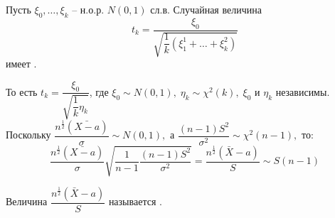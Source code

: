 \vspace{2cm}
\begin{definition}\label{cha:8/def:1}
  Пусть $ \xi_0, \ldots, \xi_k $ -- н.о.р. $ N(0, 1) $ сл.в. Случайная величина 
  $$\displaystyle t_k = \dfrac{\xi_0}{\sqrt{\dfrac{1}{k}(\xi_1^1 + \ldots + \xi_k^2)}} $$ 
  имеет .
\end{definition}
То есть $ t_k = \dfrac{\xi_0}{\sqrt{\dfrac{1}{k}\eta_k}} $, где $ \xi_0 \sim N(0, 1), \; \eta_k \sim \chi^2(k), \; \xi_0 \text{ и } \eta_k $ независимы.\\

Поскольку $\displaystyle \dfrac{n^{\frac{1}{2}}(\bar{X - a})}{\sigma} \sim N(0, 1), \text{ а } \dfrac{(n - 1)S^2}{\sigma^2} \sim \chi^2(n - 1),  $ то: 
$$\displaystyle \dfrac{n^{\frac{1}{2}}(\bar{X - a})}{\sigma}\sqrt{\dfrac{1}{n-1}\dfrac{(n - 1)S^2}{\sigma^2}} = \dfrac{n^{\frac{1}{2}}(\bar{X} - a)}{S} \sim S(n - 1)$$

Величина $ \dfrac{n^{\frac{1}{2}}(\bar{X} - a)}{S} $ называется .












